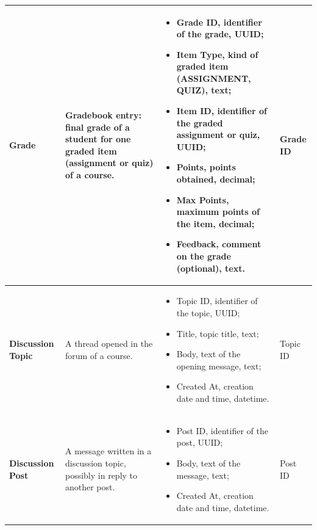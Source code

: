 {\begin{longtable}{|p{}|p{}|p{}|p{}|}
    \textbf{Grade} & Gradebook entry: final grade of a student for one graded item (assignment or quiz) of a course. &
    \begin{itemize}[leftmargin=*,nosep,before=\vspace{-\baselineskip}\leavevmode,after=\vspace{-\baselineskip}]
        \item Grade ID, identifier of the grade, UUID;
        \item Item Type, kind of graded item (ASSIGNMENT, QUIZ), text;
        \item Item ID, identifier of the graded assignment or quiz, UUID;
        \item Points, points obtained, decimal;
        \item Max Points, maximum points of the item, decimal;
        \item Feedback, comment on the grade (optional), text.
    \end{itemize}
    & Grade ID \\ \hline

    \textbf{Discussion Topic} & A thread opened in the forum of a course. &
    \begin{itemize}[leftmargin=*,nosep,before=\vspace{-\baselineskip}\leavevmode,after=\vspace{-\baselineskip}]
        \item Topic ID, identifier of the topic, UUID;
        \item Title, topic title, text;
        \item Body, text of the opening message, text;
        \item Created At, creation date and time, datetime.
    \end{itemize}
    & Topic ID \\ \hline

    \textbf{Discussion Post} & A message written in a discussion topic, possibly in reply to another post. &
    \begin{itemize}[leftmargin=*,nosep,before=\vspace{-\baselineskip}\leavevmode,after=\vspace{-\baselineskip}]
        \item Post ID, identifier of the post, UUID;
        \item Body, text of the message, text;
        \item Created At, creation date and time, datetime.
    \end{itemize}
    & Post ID \\ \hline


\end{longtable}}
